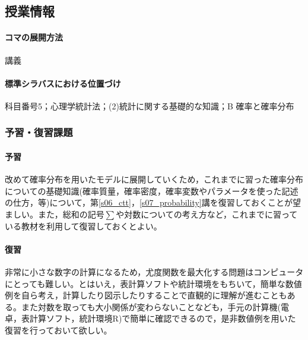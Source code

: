\subsection{授業情報}
\paragraph{コマの展開方法}
講義
\paragraph{標準シラバスにおける位置づけ}
科目番号5；心理学統計法；(2)統計に関する基礎的な知識；B 確率と確率分布
\subsubsection{予習・復習課題}
\paragraph{予習}
改めて確率分布を用いたモデルに展開していくため，これまでに習った確率分布についての基礎知識(確率質量，確率密度，確率変数やパラメータを使った記述の仕方，等)について，第\ref{s06_ctt}，\ref{s07_probability}講を復習しておくことが望ましい。また，総和の記号$\sum$や対数についての考え方など，これまでに習っている教材を利用して復習しておくとよい。
\paragraph{復習}
非常に小さな数字の計算になるため，尤度関数を最大化する問題はコンピュータにとっても難しい。とはいえ，表計算ソフトや統計環境をもちいて，簡単な数値例を自ら考え，計算したり図示したりすることで直観的に理解が進むこともある。また対数を取っても大小関係が変わらないことなども，手元の計算機(電卓，表計算ソフト，統計環境R)で簡単に確認できるので，是非数値例を用いた復習を行っておいて欲しい。